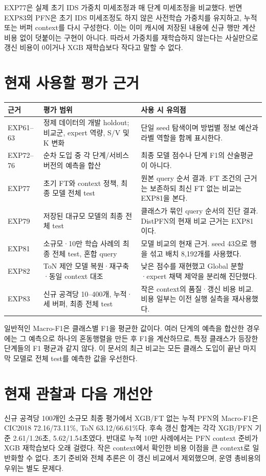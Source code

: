 EXP77은 실제 초기 IDS 가중치 미세조정과 매 단계 미세조정을 비교했다.
반면 EXP83의 PFN은 초기 IDS 미세조정도 하지 않은 사전학습 가중치를 유지하고,
누적 또는 버퍼 context를 다시 구성한다. 이는 이미 캐시에 저장된 내용에 신규 행만 계산 비용 없이 덧붙이는 구현이 아니다.
따라서 가중치를 재학습하지 않는다는 사실만으로 갱신 비용이 0이거나 XGB 재학습보다 작다고 말할 수 없다.

\section{현재 사용할 평가 근거}
\begin{longtable}{p{.16\linewidth}p{.34\linewidth}p{.42\linewidth}}
\toprule 근거 & 평가 범위 & 사용 시 유의점 \\\midrule\endhead
EXP61--63 & 정제 데이터의 개발 holdout; 비교군, expert 역량, S/V 및 K 변화 & 단일 seed 탐색이며 방법별 정보 예산과 라벨 역할을 함께 표시한다. \\
EXP72--76 & 순차 도입 중 각 단계/서비스 버전의 예측을 합산 & 최종 모델 점수나 단계 F1의 산술평균이 아니다. \\
EXP77 & 초기 FT와 context 정책, 최종 모델 전체 test & 원본 query 순서 결과. FT 조건의 근거는 보존하되 최신 FT 없는 비교는 EXP81을 본다. \\
EXP79 & 저장된 대규모 모델의 최종 전체 test & 클래스가 묶인 query 순서의 진단 결과. DistPFN의 현재 비교 근거는 EXP81이다. \\
EXP81 & 소규모·10만 학습 사례의 최종 전체 test, 혼합 query & 모델 비교의 현재 근거. seed 43으로 행을 섞고 배치 8,192개를 사용했다. \\
EXP82 & ToN 제안 모델 복원·재구축·동일 context 대조 & 낮은 점수를 재현했고 Global 분할·expert 채택 제약을 분리해 진단했다. \\
EXP83 & 신규 공격당 10--400개, 누적·세 버퍼, 최종 전체 test & 작은 context의 품질·갱신 비용 비교. 비용 일부는 이전 실행 실측을 재사용했다. \\
\bottomrule
\end{longtable}

일반적인 Macro-F1은 클래스별 F1을 평균한 값이다. 여러 단계의 예측을 합산한 경우에는
그 예측으로 하나의 혼동행렬을 만든 후 F1을 계산하므로, 특정 클래스가 등장한 단계들의 F1 평균과 같지 않다.
이 문서의 최근 비교는 모든 클래스 도입이 끝난 마지막 모델로 전체 test를 예측한 값을 우선한다.

\section{현재 관찰과 다음 개선안}
신규 공격당 100개인 소규모 최종 평가에서 XGB/FT 없는 누적 PFN의 Macro-F1은
CIC2018 72.16/73.11\%, ToN 63.12/66.61\%다.
후속 갱신 합계는 각각 XGB/PFN 기준 2.61/1.26초, 5.62/1.54초였다.
반대로 누적 10만 사례에서는 PFN context 준비가 XGB 재학습보다 오래 걸렸다.
작은 context에서 확인한 비용 이점을 큰 context로 일반화할 수 없다.
초기 준비와 전체 추론은 이 갱신 비교에서 제외했으며, 운영 총비용의 우위는 별도 문제다.

